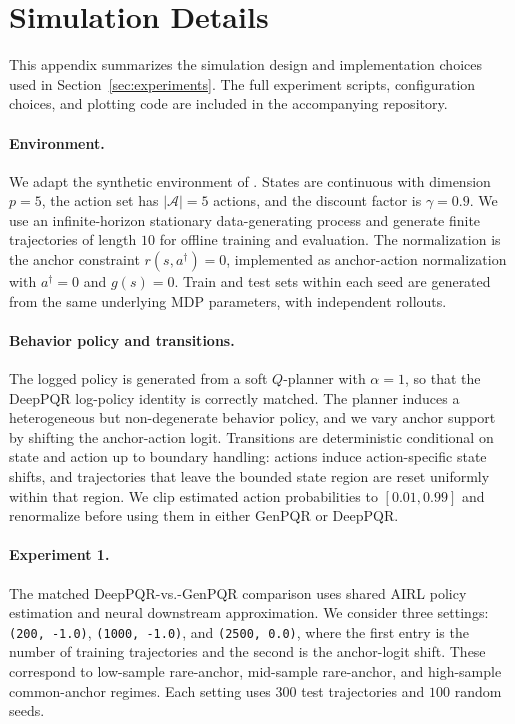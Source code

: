 \section{Simulation Details}
\label{app:simulation-details}

This appendix summarizes the simulation design and implementation choices used
in Section~\ref{sec:experiments}. The full experiment scripts, configuration
choices, and plotting code are included in the accompanying repository.

\paragraph{Environment.}
We adapt the synthetic environment of \citet{geng2020deep}. States are
continuous with dimension \(p=5\), the action set has \(|\mathcal A|=5\)
actions, and the discount factor is \(\gamma=0.9\). We use an infinite-horizon
stationary data-generating process and generate finite trajectories of length
\(10\) for offline training and evaluation. The normalization is the anchor
constraint \(r(s,a^\dagger)=0\), implemented as anchor-action normalization
with \(a^\dagger=0\) and \(g(s)=0\). Train and test sets within each seed are
generated from the same underlying MDP parameters, with independent rollouts.

\paragraph{Behavior policy and transitions.}
The logged policy is generated from a soft \(Q\)-planner with \(\alpha=1\), so
that the DeepPQR log-policy identity is correctly matched. The planner induces
a heterogeneous but non-degenerate behavior policy, and we vary anchor support
by shifting the anchor-action logit. Transitions are deterministic conditional
on state and action up to boundary handling: actions induce action-specific
state shifts, and trajectories that leave the bounded state region are reset
uniformly within that region. We clip estimated action probabilities to
\([0.01,0.99]\) and renormalize before using them in either GenPQR or DeepPQR.

\paragraph{Experiment 1.}
The matched DeepPQR-vs.-GenPQR comparison uses shared AIRL policy estimation
and neural downstream approximation. We consider three settings:
\texttt{(200, -1.0)}, \texttt{(1000, -1.0)}, and \texttt{(2500, 0.0)}, where
the first entry is the number of training trajectories and the second is the
anchor-logit shift. These correspond to low-sample rare-anchor, mid-sample
rare-anchor, and high-sample common-anchor regimes. Each setting uses \(300\)
test trajectories and \(100\) random seeds.

